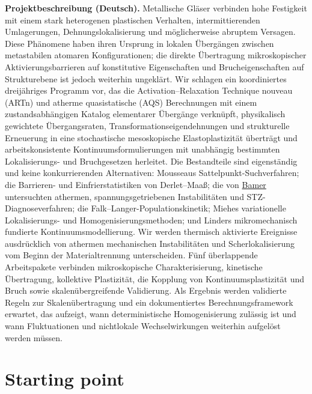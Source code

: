 \documentclass[11pt,a4paper]{article}
\begin{document}
\textbf{Projektbeschreibung (Deutsch).} Metallische Gläser verbinden hohe Festigkeit mit einem stark heterogenen plastischen Verhalten, intermittierenden Umlagerungen, Dehnungslokalisierung und möglicherweise abruptem Versagen. Diese Phänomene haben ihren Ursprung in lokalen Übergängen zwischen metastabilen atomaren Konfigurationen; die direkte Übertragung mikroskopischer Aktivierungsbarrieren auf konstitutive Eigenschaften und Brucheigenschaften auf Strukturebene ist jedoch weiterhin ungeklärt. Wir schlagen ein koordiniertes dreijähriges Programm vor, das die Activation--Relaxation Technique nouveau (ARTn) und atherme quasistatische (AQS) Berechnungen mit einem zustandsabhängigen Katalog elementarer Übergänge verknüpft, physikalisch gewichtete Übergangsraten, Transformationseigendehnungen und strukturelle Erneuerung in eine stochastische mesoskopische Elastoplastizität überträgt und arbeitskonsistente Kontinuumsformulierungen mit unabhängig bestimmten Lokalisierungs- und Bruchgesetzen herleitet. Die Bestandteile sind eigenständig und keine konkurrierenden Alternativen: Mousseaus Sattelpunkt-Suchverfahren; die Barrieren- und Einfrierstatistiken von Derlet--Maa\ss{}; die von \underline{Bamer} untersuchten athermen, spannungsgetriebenen Instabilitäten und STZ-Diagnoseverfahren; die Falk--Langer-Populationskinetik; Miehes variationelle Lokalisierungs- und Homogenisierungsmethoden; und Linders mikromechanisch fundierte Kontinuumsmodellierung. Wir werden thermisch aktivierte Ereignisse ausdrücklich von athermen mechanischen Instabilitäten und Scherlokalisierung vom Beginn der Materialtrennung unterscheiden. Fünf überlappende Arbeitspakete verbinden mikroskopische Charakterisierung, kinetische Übertragung, kollektive Plastizität, die Kopplung von Kontinuumsplastizität und Bruch sowie skalenübergreifende Validierung. Als Ergebnis werden validierte Regeln zur Skalenübertragung und ein dokumentiertes Berechnungsframework erwartet, das aufzeigt, wann deterministische Homogenisierung zulässig ist und wann Fluktuationen und nichtlokale Wechselwirkungen weiterhin aufgelöst werden müssen.

\clearpage
{\small\hypersetup{linkcolor=blue,linktoc=all}\tableofcontents}
\clearpage
\section{Starting point}
\end{document}
